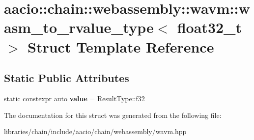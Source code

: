 \hypertarget{structaacio_1_1chain_1_1webassembly_1_1wavm_1_1wasm__to__rvalue__type_3_01float32__t_01_4}{}\section{aacio\+:\+:chain\+:\+:webassembly\+:\+:wavm\+:\+:wasm\+\_\+to\+\_\+rvalue\+\_\+type$<$ float32\+\_\+t $>$ Struct Template Reference}
\label{structaacio_1_1chain_1_1webassembly_1_1wavm_1_1wasm__to__rvalue__type_3_01float32__t_01_4}
\subsection*{Static Public Attributes}
\begin{DoxyCompactItemize}
\item 
\mbox{\label{structaacio_1_1chain_1_1webassembly_1_1wavm_1_1wasm__to__rvalue__type_3_01float32__t_01_4_a696c11259500a94c732300a6cd78f06f}} 
static constexpr auto {\bfseries value} = Result\+Type\+::f32
\end{DoxyCompactItemize}


The documentation for this struct was generated from the following file\+:\begin{DoxyCompactItemize}
\item 
libraries/chain/include/aacio/chain/webassembly/wavm.\+hpp\end{DoxyCompactItemize}
